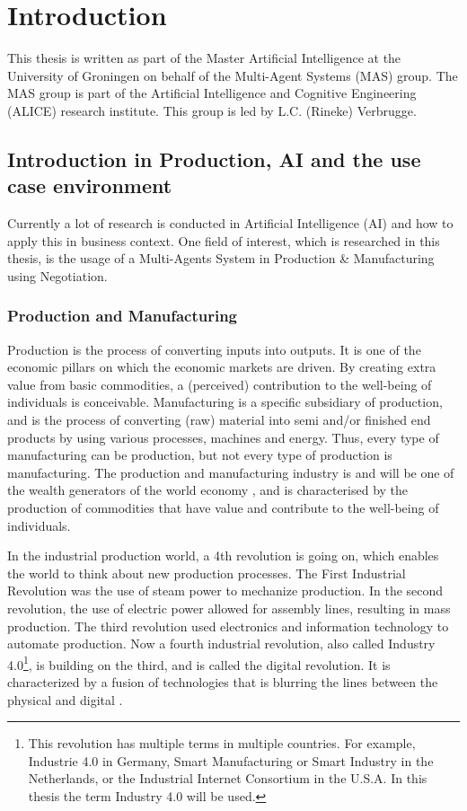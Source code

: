 \chapter{Introduction}
\label{ch:intro}
This thesis is written as part of the Master Artificial Intelligence at the University of Groningen on behalf of the Multi-Agent Systems (MAS) group. The MAS group is part of the Artificial Intelligence and Cognitive Engineering (ALICE) research institute. This group is led by L.C. (Rineke) Verbrugge.  
   
\section{Introduction in Production, AI and the use case environment}

Currently a lot of research is conducted in Artificial Intelligence (AI) and how to apply this in business context. One field of interest, which is researched in this thesis, is the usage of a Multi-Agents System in Production \& Manufacturing using Negotiation.

\subsection{Production and Manufacturing}
Production is the process of converting inputs into outputs. It is one of the economic pillars on which the economic markets are driven. By creating extra value from basic commodities, a (perceived) contribution to the well-being of individuals is conceivable. Manufacturing is a specific subsidiary of production, and is the process of converting (raw) material into semi and/or finished end products by using various processes, machines and energy. Thus, every type of manufacturing can be production, but not every type of production is manufacturing. The production and manufacturing industry is and will be one of the wealth generators of the world economy \citep{monostori2006agent}, and is characterised by the production of commodities that have value and contribute to the well-being of individuals.

In the industrial production world, a 4th revolution is going on, which enables the world to think about new production processes. The First Industrial Revolution was the use of steam power to mechanize production. In the second revolution, the use of electric power allowed for assembly lines, resulting in mass production. The third revolution used electronics and information technology to automate production. Now a fourth industrial revolution, also called Industry 4.0\footnote{This revolution has multiple terms in multiple countries. For example, Industrie 4.0 in Germany, Smart Manufacturing or Smart Industry in the Netherlands, or the Industrial Internet Consortium in the U.S.A. In this thesis the term Industry 4.0 will be used.}, is building on the third, and is called the digital revolution. It is characterized by a fusion of technologies that is blurring the lines between the physical and digital \citep{leitao2016smart}.

